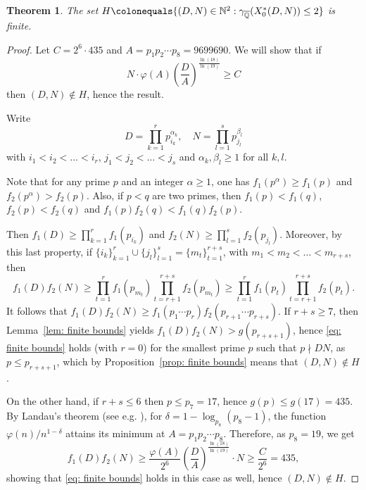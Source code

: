 \documentclass[12pt]{amsart}
\newcommand{\N}{\mathbb{N}}
\newcommand{\Q}{\mathbb{Q}}
\newcommand{\Qbar}{{\overline{\Q}}}
\numberwithin{equation}{subsection}
\newtheorem{theorem}[equation]{Theorem}
\theoremstyle{plain}\newtheorem{ithm}{Theorem}
\theoremstyle{plain}\newtheorem{iprop}[ithm]{Proposition}
\theoremstyle{definition}
\theoremstyle{remark}
\newcommand{\StarCurve}[2]{X_0^*({#1},{#2})} %
\begin{document}
\begin{theorem}
\label{thm:finiteness}
    The set 
    $
    H \colonequals \{ (D,N) \in \N^2 : \gamma_{\Qbar}(\StarCurve{D}{N}) \le 2 \}
    $
    is finite.
\end{theorem}

\begin{proof}
     Let $C = 2^6 \cdot 435$ and $A = p_1 p_2 \cdots p_8 = 9699690$. We will show that if $$N \cdot \varphi(A) \left( \frac{D}{A} \right)^{\frac{\ln(18)}{\ln(19)}}\ge C$$ then $(D,N) \notin H$, hence the result.

     Write 
     $$
     D = \prod_{k=1}^r p_{i_k}^{\alpha_k}, \quad N = \prod_{l=1}^s p_{j_l}^{\beta_l}
     $$ 
     with $i_1 < i_2 < \ldots < i_r$, $j_1 < j_2 < \ldots < j_s$ and $\alpha_k, \beta_l\ge 1$ for all $k,l$. 

     Note that for any prime $p$ and an integer $\alpha \ge 1$, one has $f_1(p^{\alpha}) \ge f_1(p)$ and $f_2(p^{\alpha}) > f_2(p)$. Also, if $p < q$ are two primes, then $f_1(p) < f_1(q)$, $f_2(p) < f_2(q)$ and $f_1(p)f_2(q) < f_1(q) f_2(p)$.

     Then $f_1(D) \ge \prod_{k=1}^r f_1(p_{i_k})$ and $f_2(N) \ge \prod_{l=1}^s f_2(p_{j_l})$.
     Moreover, by this last property, if $\{i_k \}_{k=1}^r \cup \{j_l \}_{l=1}^s = \{m_t\}_{t=1}^{r+s}$, with $m_1 < m_2 < \ldots < m_{r+s}$, then 
     $$
     f_1(D) f_2(N) \ge \prod_{t=1}^r f_1(p_{m_t}) \prod_{t=r+1}^{r+s} f_2(p_{m_t})
     \ge  \prod_{t=1}^r f_1(p_t) \prod_{t=r+1}^{r+s} f_2(p_t).
     $$
     It follows that $f_1(D)f_2(N) \ge f_1(p_1 \cdots p_r) f_2(p_{r+1} \cdots p_{r+s})$.
     If $r+s \ge 7$, then Lemma~\ref{lem: finite bounds} yields $f_1(D) f_2(N) > g(p_{r+s+1})$, hence \eqref{eq: finite bounds} holds (with $r = 0$) for the smallest prime $p$ such that $p \nmid DN$, as $p \le p_{r+s+1}$, which by Proposition~\ref{prop: finite bounds} means that $(D,N) \notin H$. 

     On the other hand, if $r + s \le 6$ then $p \le p_7 = 17$, hence $g(p) \le g(17) = 435$. 
     By Landau's theorem (see e.g. \cite[proof of Theorem 328, \S 22.9]{HardyWright}), for $\delta = 1 - \log_{p_8}(p_8 - 1)$, the function $\varphi(n)/n^{1-\delta}$ attains its minimum at $A = p_1  p_2 \cdots p_8$. Therefore, as $p_8 = 19$, we get
     $$
     f_1(D) f_2(N) \ge \frac{\varphi(A)}{2^6} \left( \frac{D}{A} \right)^{\frac{\ln(18)}{\ln(19)}} \cdot N \ge \frac{C}{2^6} = 435,
     $$
     showing that \eqref{eq: finite bounds} holds in this case as well, hence $(D,N) \notin H$.
\end{proof}
\end{document}
